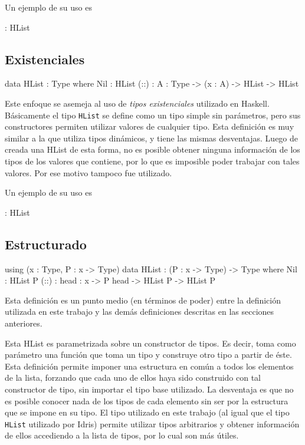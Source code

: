 \begin{code}
\begin{code}
{Un ejemplo de su uso es 

\begin{code}
 : HList
\end{code}

\subsection{Existenciales}

\begin{code}
data HList : Type where
    Nil : HList
    (::) : {A : Type} -> (x : A) -> HList -> HList
\end{code}

Este enfoque se asemeja al uso de \textit{tipos existenciales} utilizado en Haskell. Básicamente el tipo \texttt{HList} se define como un tipo simple sin parámetros, pero sus constructores permiten utilizar valores de cualquier tipo.
Esta definición es muy similar a la que utiliza tipos dinámicos, y tiene las mismas desventajas. Luego de creada una HList de esta forma, no es posible obtener ninguna información de los tipos de los valores que contiene, por lo que es imposible poder trabajar con tales valores. Por ese motivo tampoco fue utilizado.

Un ejemplo de su uso es

\begin{code}
[1,"2"] : HList
\end{code}

\subsection{Estructurado}

\begin{code}
using (x : Type, P : x -> Type)        
    data HList : (P : x -> Type) ->  Type where
        Nil : HList P
        (::) : {head : x} -> P head -> HList P -> 
          HList P 
\end{code}

Esta definición es un punto medio (en términos de poder) entre la definición utilizada en este trabajo y las demás definiciones descritas en las secciones anteriores.

Esta HList es parametrizada sobre un constructor de tipos. Es decir, toma como parámetro una función que toma un tipo y construye otro tipo a partir de éste. Esta definición permite imponer una estructura en común a todos los elementos de la lista, forzando que cada uno de ellos haya sido construido con tal constructor de tipo, sin importar el tipo base utilizado.
La desventaja es que no es posible conocer nada de los tipos de cada elemento sin ser por la estructura que se impone en su tipo. El tipo utilizado en este trabajo (al igual que el tipo \texttt{HList} utilizado por Idris) permite utilizar tipos arbitrarios y obtener información de ellos accediendo a la lista de tipos, por lo cual son más útiles.

}
\end{code}
\end{code}
